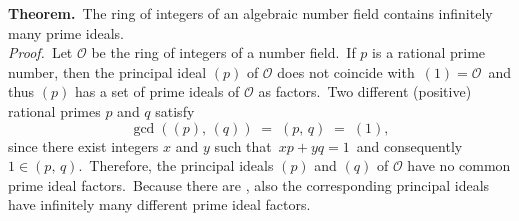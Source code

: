 \documentclass[12pt]{article}
\theoremstyle{definition}
\begin{document}
\textbf{Theorem.}\, The ring of integers of an algebraic number field contains infinitely many prime ideals.\\

\emph{Proof.}\, Let $\mathcal{O}$ be the ring of integers of a number field.\, If $p$ is a rational prime number, then the principal ideal $(p)$ of $\mathcal{O}$ does not coincide with\, $(1) = \mathcal{O}$\, and thus $(p)$ has a set of prime ideals of $\mathcal{O}$ as factors.\, Two different (positive) rational primes $p$ and $q$ satisfy
$$\gcd((p),\,(q)) \;=\; (p,\,q) \;=\; (1),$$
since there exist integers $x$ and $y$ such that\, $xp\!+\!yq = 1$\, and consequently\, $1 \in (p,\,q)$.\, Therefore, the principal ideals $(p)$ and $(q)$ of $\mathcal{O}$ have no common prime ideal factors.\, Because there are , also the corresponding principal ideals have infinitely many different prime ideal factors.
\end{document}
